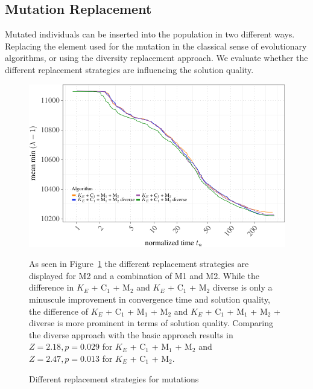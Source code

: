 \documentclass[a4paper,12pt,titlepage, BCOR7mm,headsepline]{scrbook}
\numberwithin{equation}{section}
\begin{document}

\subsection{Mutation Replacement}


Mutated individuals can be inserted into the population in two different ways. Replacing the element used for the mutation in the classical sense of evolutionary algorithms, or using the diversity replacement approach. We evaluate whether the different replacement strategies are influencing the solution quality.
\begin{figure}[H]

\begin{center}
\includegraphics{rnw/tuning_subset_plots/diverse_plot-1}\caption{Different replacement strategies for mutations}\label{fig:rep_strat}

\end{center}
As seen in Figure~\ref{fig:rep_strat} the different replacement strategies are displayed for M2 and a combination of M1 and M2. While the difference in $K_E$ + C$_1$ + M$_2$ and $K_E$ + C$_1$ + M$_2$ diverse is only a minuscule improvement in convergence time and solution quality, the difference of $K_E$ + C$_1$ + M$_1$ + M$_2$ and $K_E$ + C$_1$ + M$_1$ + M$_2$ + diverse is more prominent in terms of solution quality. Comparing the diverse approach with the basic approach results in $Z = 2.18, p = 0.029$ for $K_E$ + C$_1$ + M$_1$ + M$_2$ and $Z = 2.47, p = 0.013$ for $K_E$ + C$_1$ + M$_2$.

\end{figure}
\end{document}
